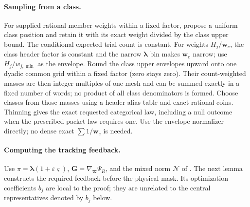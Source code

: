 \documentclass[11pt]{article}
\theoremstyle{remark}
\newcommand{\llambda}{\boldsymbol{\lambda}}
\newcommand{\ww}{\mathbf w}
\newcommand{\vvs}{\boldsymbol{\varsigma}}
\newcommand{\vvp}{\boldsymbol{\varpi}}
\newcommand{\GG}{\mathbf G}
\begin{document}
\paragraph{Sampling from a class.}\label{par:ram30-class-sampling}
For supplied rational member weights within a fixed factor, propose a uniform
class position and retain it with its exact weight divided by the class upper
bound.
The conditional expected trial count is constant.
For weights $H_j/\ww_e$, the class header factor is constant and the narrow
$\llambda$ bin makes $\ww_e$ narrow; use $H_j/w_{j,\min}$ as the envelope.
Round the class upper envelopes upward onto one dyadic common grid within a
fixed factor (zero stays zero).
Their count-weighted masses are then integer multiples of one mesh and can be
summed exactly in a fixed number of words; no product of all class denominators
is formed.
Choose classes from those masses using a header alias table and exact rational
coins.
Thinning gives the exact requested categorical law, including a null outcome
when the prescribed packet law requires one.
Use the envelope normalizer directly; no dense exact $\sum1/\ww_e$ is needed.

\paragraph{Computing the tracking feedback.}
Use $\pi=\llambda(1+\varepsilon\vvs)$, $\GG=\nabla_{\vvp}\Psi_R$, and the mixed norm
$\mathcal N$ of .
The next lemma constructs the required feedback before the physical mask.
Its optimization coefficients $b_j$ are local to the proof; they are unrelated
to the central representatives denoted by $b_j$ below.
\end{document}
